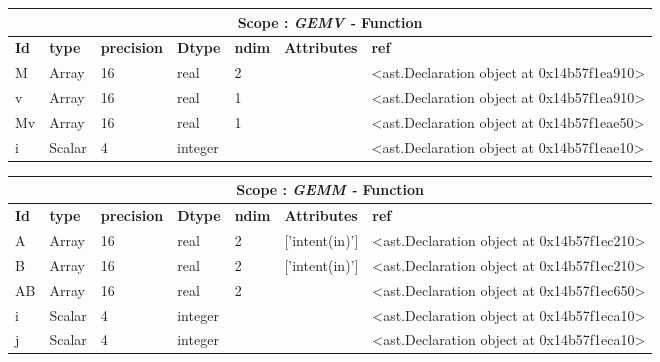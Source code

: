 \documentclass{report}
\begin{document}
 \vspace{1cm}

\begin{center}
\begin{longtable}{|p{3.5cm}|p{1.5cm}|p{1.5cm}|p{1.5cm}|p{1cm}|p{2cm}|p{4cm}| }
\hline
\multicolumn{7}{|c|}{\textbf{Scope : \qquad}  \textbf{\textit{GEMV - }Function}}\\ 
\hline
\textbf{Id} & \textbf{type} & \textbf{precision} & \textbf{Dtype} & \textbf{ndim} & \textbf{Attributes} & \textbf{ref} \\\hline

M & Array & 16 & real & 2 &  & <ast.Declaration object at 0x14b57f1ea910> \\\hline

v & Array & 16 & real & 1 &  & <ast.Declaration object at 0x14b57f1ea910> \\\hline

Mv & Array & 16 & real & 1 &  & <ast.Declaration object at 0x14b57f1eae50> \\\hline

i & Scalar & 4 & integer &  &  & <ast.Declaration object at 0x14b57f1eae10> \\\hline

\end{longtable}
\end{center}

 \vspace{1cm}

\begin{center}
\begin{longtable}{|p{3.5cm}|p{1.5cm}|p{1.5cm}|p{1.5cm}|p{1cm}|p{2cm}|p{4cm}| }
\hline
\multicolumn{7}{|c|}{\textbf{Scope : \qquad}  \textbf{\textit{GEMM - }Function}}\\ 
\hline
\textbf{Id} & \textbf{type} & \textbf{precision} & \textbf{Dtype} & \textbf{ndim} & \textbf{Attributes} & \textbf{ref} \\\hline

A & Array & 16 & real & 2 & ['intent(in)'] & <ast.Declaration object at 0x14b57f1ec210> \\\hline

B & Array & 16 & real & 2 & ['intent(in)'] & <ast.Declaration object at 0x14b57f1ec210> \\\hline

AB & Array & 16 & real & 2 &  & <ast.Declaration object at 0x14b57f1ec650> \\\hline

i & Scalar & 4 & integer &  &  & <ast.Declaration object at 0x14b57f1eca10> \\\hline

j & Scalar & 4 & integer &  &  & <ast.Declaration object at 0x14b57f1eca10> \\\hline

\end{longtable}
\end{center}
\end{document}
